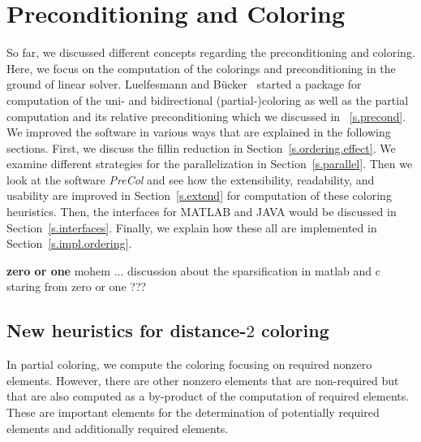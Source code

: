 \documentclass[12pt, oneside]{book}
\newcommand{\todo}[1]{\textbf{#1}}
\begin{document}
\chapter{Preconditioning and Coloring}
\label{package}
So far, we discussed different concepts regarding the preconditioning and coloring.
Here, we focus on the computation of the colorings and preconditioning in the ground of linear solver. 
Luelfesmann and B{\"u}cker~\cite{Lulfesmann2012Fap} started a package for computation of the uni- 
and bidirectional (partial-)coloring as well as the partial computation and its relative preconditioning which we discussed in ~\ref{s.precond}. 
We improved the software in various ways that are explained in the following sections.
First, we discuss the fillin reduction in Section~\ref{s.ordering.effect}.
We examine different strategies for the parallelization 
in Section~\ref{s.parallel}.
Then we look at the software \textit{PreCol} and 
see how the extensibility, readability, and usability are improved 
in Section~\ref{s.extend} for computation of these coloring heuristics. 
Then, the interfaces for MATLAB and JAVA would be discussed
in Section~\ref{s.interfaces}.
Finally, we explain how these all are implemented in
Section~\ref{s.impl.ordering}.

\todo{zero or one}
mohem ... discussion about the sparsification in matlab and c
staring from zero or one ???

\section{New heuristics for distance-$2$ coloring}
\label{s.heuristic}

In partial coloring, we compute the coloring focusing on
required nonzero elements. However, there are other nonzero
elements that are non-required but that are also computed as a
by-product of the computation of required elements. 
These are important elements for the determination of potentially required elements
and additionally required elements. 
\end{document}
